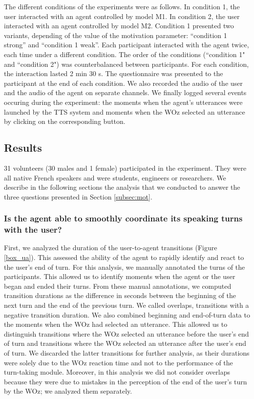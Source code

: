 \documentclass[twocolumn]{svjour3}
\begin{document}
The different conditions of the experiments were as follows.
In condition 1, the user interacted with an agent controlled by model M1.
In condition 2, the user interacted with an agent controlled by model M2.
Condition 1 presented two variants, depending of the value of the motivation parameter: ``condition 1 strong'' and ``condition 1 weak''. 
Each participant interacted with the agent twice, each time under a different condition.
The order of the conditions (``condition 1" and ``condition 2") was counterbalanced between participants. For each condition, the interaction lasted 2 min 30 s. The questionnaire was presented to the participant at the end of each condition. We also recorded the audio of the user and the audio of the agent on separate channels. We finally logged several events occuring during the experiment: the moments when the agent's utterances were launched by the TTS system and moments when the WOz selected an utterance by clicking on the corresponding button. 


\subsection{Results}

31 volunteers (30 males and 1 female) participated in the experiment. They were all native French speakers and were students, engineers or researchers. We describe in the following sections the analysis that we conducted to answer the three questions presented in Section \ref{subsec:mot}.

\subsubsection{Is the agent able to smoothly coordinate its speaking turns with the user?}

First, we analyzed the duration of the user-to-agent transitions (Figure \ref{box_ua}). This assessed the ability of the agent to rapidly identify and react to the user's end of turn. For this analysis, we manually annotated the turns of the participants. This allowed us to identify moments when the agent or the user began and ended their turns. From these manual annotations, we computed transition durations as the difference in seconds between the beginning of the next turn and the end of the previous turn. We called overlaps, transitions with a negative transition duration. We also combined beginning and end-of-turn data to the moments when the WOz had selected an utterance. This allowed us to distinguish transitions where the WOz selected an utterance before the user's end of turn and transitions where the WOz selected an utterance after the user's end of turn. We discarded the latter transitions for further analysis, as their durations were solely due to the WOz reaction time and not to the performance of the turn-taking module. Moreover, in this analysis we did not consider overlaps because they were due to mistakes in the perception of the end of the user's turn by the WOz; we analyzed them separately.
\end{document}
